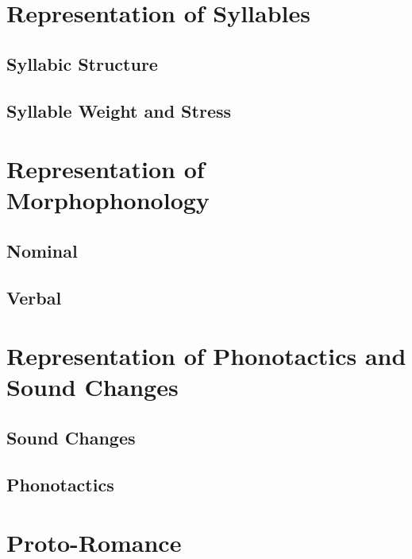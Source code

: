 \documentclass{report}
\begin{document}
\chapter{Representation of Syllables}

\section{Syllabic Structure}

\section{Syllable Weight and Stress}

\chapter{Representation of Morphophonology}

\section{Nominal}

\section{Verbal}

\chapter{Representation of Phonotactics and Sound Changes}


\section{Sound Changes}

\section{Phonotactics}

\chapter{Proto-Romance}
\end{document}
